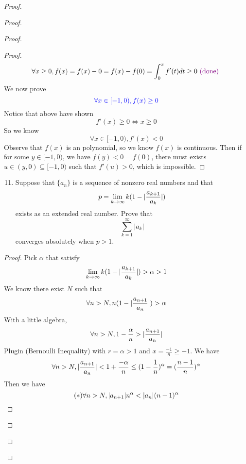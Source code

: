 \documentclass{report}
\begin{document}
\begin{proof}
\begin{proof}
\begin{proof}
\begin{proof}
\begin{equation}
\forall x\geq 0, f(x)=f(x)-0=f(x)-f(0)=\int_{0}^x f'(t)dt\geq 0\textcolor{violet}{\text{ (done) }}
\end{equation}
We now prove
\begin{equation}
\textcolor{blue}{\forall x\in [-1,0), f(x)\geq 0}
\end{equation}
Notice that above have shown
\begin{equation}
f'(x)\geq 0\iff  x\geq 0
\end{equation}
So we know
\begin{equation}
\forall x\in [-1,0), f'(x)<0
\end{equation}
Observe that $f(x)$ is an polynomial, so we know  $f(x)$ is continuous. Then if for some $y\in [-1,0)$, we have $f(y)<0=f(0)$, there must exists $u\in (y,0)\subseteq [-1,0)$ such that $f'(u)>0$, which is impossible.
\end{proof}
\begin{question}{}{}
\begin{enumerate}
    \setcounter{enumi}{10}
    \item Suppose that \( \{ a_n \} \) is a sequence of nonzero real numbers and that
    \[
    p = \lim_{{k \to \infty}} k(1-|\frac{a_{k+1}}{a_k}|)
    \]
    exists as an extended real number. Prove that
    \[
    \sum_{k=1}^{\infty} |a_k|
    \]
    converges absolutely when \( p > 1 \).
\end{enumerate}
\end{question}
\begin{proof}
Pick $\alpha $ that satisfy
\begin{equation}
\lim_{k\to\infty}k(1-|\frac{a_{k+1}}{a_k}|)>\alpha >1
\end{equation}
We know there exist $N$ such that
 \begin{equation}
\forall n>N, n(1-|\frac{a_{n+1}}{a_n}|)>\alpha 
\end{equation}
With a little algebra,
\begin{equation}
\forall n>N, 1-\frac{\alpha }{n}>|\frac{a_{n+1}}{a_n}|
\end{equation}
Plugin  (Bernoulli Inequality) with $r=\alpha >1$ and $x=\frac{-1}{n}\geq -1$. We have
\begin{equation}
\forall n>N,|\frac{a_{n+1}}{a_n}|<1+\frac{-\alpha }{n}\leq (1-\frac{1}{n})^\alpha= (\frac{n-1}{n})^{\alpha }
\end{equation}
Then we have
\begin{equation}
  (*)\forall n>N, |a_{n+1}|n^\alpha < |a_n| (n-1)^{\alpha }
\end{equation}

\end{proof}
\end{proof}
\end{proof}
\end{proof}
\end{document}
